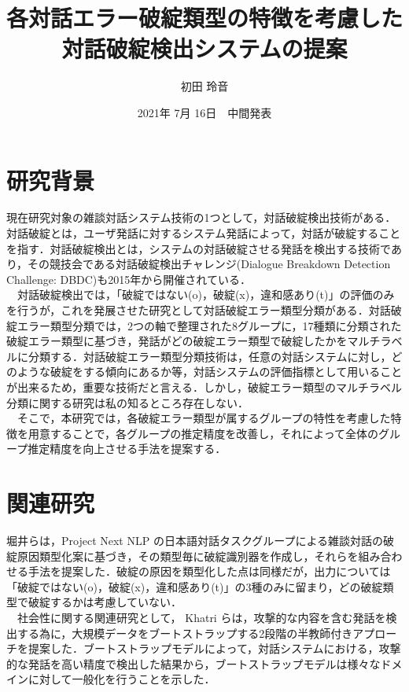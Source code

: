\documentclass[upLaTex, 10pt,dvipdfmx,a4paper,twocolumn]{jsarticle}
\begin{document}
\title{各対話エラー破綻類型の特徴を考慮した対話破綻検出システムの提案}
\author{初田 玲音}
\date{2021年 7月 16日　中間発表}


\maketitle

\section{研究背景}
    現在研究対象の雑談対話システム技術の1つとして，対話破綻検出技術がある．対話破綻とは，ユーザ発話に対するシステム発話によって，対話が破綻することを指す．対話破綻検出とは，システムの対話破綻させる発話を検出する技術であり，その競技会である対話破綻検出チャレンジ(Dialogue Breakdown Detection Challenge: DBDC)も2015年から開催されている\cite{higashinaka}．\\
    　対話破綻検出では，「破綻ではない(o)，破綻(x)，違和感あり(t)」の評価のみを行うが，これを発展させた研究として対話破綻エラー類型分類がある．対話破綻エラー類型分類では，2つの軸で整理された8グループに，17種類に分類された破綻エラー類型に基づき，発話がどの破綻エラー類型で破綻したかをマルチラベルに分類する．対話破綻エラー類型分類技術は，任意の対話システムに対し，どのような破綻をする傾向にあるか等，対話システムの評価指標として用いることが出来るため，重要な技術だと言える．しかし，破綻エラー類型のマルチラベル分類に関する研究は私の知るところ存在しない．\\
    　そこで，本研究では，各破綻エラー類型が属するグループの特性を考慮した特徴を用意することで，各グループの推定精度を改善し，それによって全体のグループ推定精度を向上させる手法を提案する．

\section{関連研究}
    堀井ら\cite{hori}は，Project Next NLP の日本語対話タスクグループによる雑談対話の破綻原因類型化案に基づき，その類型毎に破綻識別器を作成し，それらを組み合わせる手法を提案した．破綻の原因を類型化した点は同様だが，出力については「破綻ではない(o)，破綻(x)，違和感あり(t)」の3種のみに留まり，どの破綻類型で破綻するかは考慮していない．\\
    　社会性に関する関連研究として， Khatri ら\cite{K}は，攻撃的な内容を含む発話を検出する為に，大規模データをブートストラップする2段階の半教師付きアプローチを提案した．ブートストラップモデルによって，対話システムにおける，攻撃的な発話を高い精度で検出した結果から，ブートストラップモデルは様々なドメインに対して一般化を行うことを示した．
\end{document}
